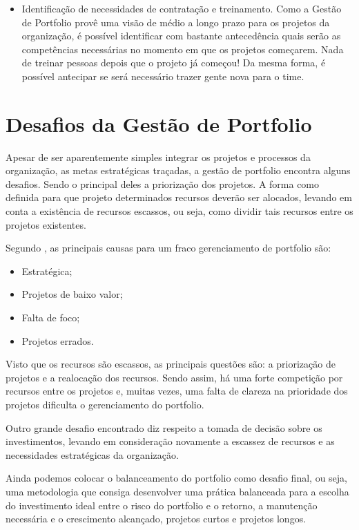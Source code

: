 \documentclass[12pt,a4paper,ruledheader,tocpage=prefix,floatnumber=continuous,pagestart=folhaderosto,font=times]{abnt}
\begin{document}
\begin{itemize}
 \item Identificação de necessidades de contratação e treinamento. Como a Gestão de Portfolio provê uma visão de médio a longo prazo para os projetos da organização, é possível identificar com bastante antecedência quais serão as competências necessárias no momento em que os projetos 
começarem. Nada de treinar pessoas depois que o projeto já começou! Da mesma forma, é possível antecipar se será necessário trazer gente nova para o time.
\end{itemize}

\section{Desafios da Gestão de Portfolio}
Apesar de ser aparentemente simples integrar os projetos e processos da organização, as metas estratégicas traçadas, a gestão de portfolio encontra alguns 
desafios. Sendo o principal deles a priorização dos projetos. A forma como definida para que projeto determinados recursos deverão ser alocados, 
levando em conta a existência de recursos escassos, ou seja, como dividir tais recursos entre os projetos existentes.

Segundo , as principais causas para um fraco gerenciamento de portfolio são:
\begin{itemize}
 \item Estratégica;
 \item Projetos de baixo valor;
 \item Falta de foco;
 \item Projetos errados.
\end{itemize}

Visto que os recursos são escassos, as principais questões são: a priorização de projetos e a realocação dos recursos. Sendo assim, há uma forte competição 
por recursos entre os projetos e, muitas vezes, uma falta de clareza na prioridade dos projetos dificulta o gerenciamento do portfolio.

Outro grande desafio encontrado diz respeito a tomada de decisão sobre os investimentos, levando em consideração novamente a escassez de recursos e as 
necessidades estratégicas da organização. 

Ainda podemos colocar o balanceamento do portfolio como desafio final, ou seja, uma metodologia que consiga 
desenvolver uma prática balanceada para a escolha do investimento ideal entre o risco do portfolio e o retorno, a manutenção necessária e o crescimento 
alcançado, projetos curtos e projetos longos.\cite{COOPER2001}
\end{document}

